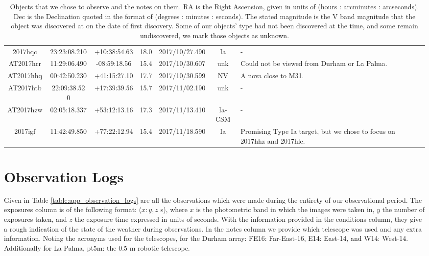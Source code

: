 \documentclass[twocolumn]{revtex4}
\begin{document}
{\begin{table}[h!]
\begin{tabularx}{\textwidth}{c c c c @{\hskip 5pt} c c X}
    2017hqc & 23:23:08.210 & +10:38:54.63 & 18.0 & 2017/10/27.490 & Ia & {-}  \\
    AT2017hrr & 11:29:06.490 & -08:59:18.56 & 15.4 & 2017/10/30.607 & unk & {Could not be viewed from Durham or La Palma. }  \\
    AT2017hhq & 00:42:50.230 & +41:15:27.10 & 17.7 & 2017/10/30.599 & NV & {A nova close to M31.}  \\
    AT2017htb & 22:09:38.52 0 & +17:39:39.56 & 15.7 & 2017/11/02.190 & unk & {-}  \\
    AT2017hzw & 02:05:18.337 & +53:12:13.16 & 17.3 & 2017/11/13.410 & Ia-CSM & {-}  \\
    2017igf & 11:42:49.850 & +77:22:12.94 & 15.4 & 2017/11/18.590 & Ia & {Promising Type Ia target, but we chose to focus on 2017hhz and 2017hle.}  \\
    \hline      
\end{tabularx}
\caption{Objects that we chose to observe and the notes on them. RA is the Right Ascension, given in units of (hours : arcminutes : arcseconds). Dec is the Declination quoted in the format of (degrees : minutes : seconds). The stated magnitude is the V band magnitude that the object was discovered at on the date of first discovery. Some of our objects' type had not been discovered at the time, and some remain undiscovered, we mark those objects as unknown.}
\label{table:app_objects_log}
\end{table}


\clearpage

\onecolumngrid
\vspace{-3ex}
\section{Observation Logs} \label{app:observations_log}
\vspace{-2ex}
Given in Table \ref{table:app_observation_logs} are all the observations which were made during the entirety of our observational period. The exposures column is of the following format: ($x: y, z$ s), where $x$ is the photometric band in which the images were taken in, $y$ the number of exposures taken, and $z$ the exposure time expressed in units of seconds. With the information provided in the conditions column, they give a rough indication of the state of the weather during observations. In the notes column we provide which telescope was used and any extra information. Noting the acronyms used for the telescopes, for the Durham array: FE16: Far-East-16, E14: East-14, and W14: West-14. Additionally for La Palma, pt5m: the $0.5$ m robotic telescope.

}
\end{document}
